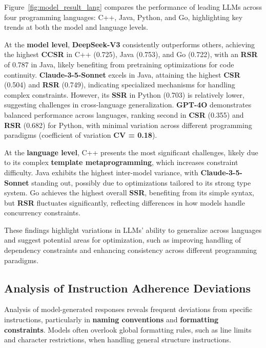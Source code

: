 Figure~\ref{fig:model_result_lang} compares the performance of leading LLMs across four programming languages: C++, Java, Python, and Go, highlighting key trends at both the model and language levels.

At the \textbf{model level}, \textbf{DeepSeek-V3} consistently outperforms others, achieving the highest \textbf{CCSR} in C++ (0.725), Java (0.753), and Go (0.722), with an \textbf{RSR} of 0.787 in Java, likely benefiting from pretraining optimizations for code continuity. \textbf{Claude-3-5-Sonnet} excels in Java, attaining the highest \textbf{CSR} (0.504) and \textbf{RSR} (0.749), indicating specialized mechanisms for handling complex constraints. However, its \textbf{SSR} in Python (0.703) is relatively lower, suggesting challenges in cross-language generalization. \textbf{GPT-4O} demonstrates balanced performance across languages, ranking second in \textbf{CSR} (0.355) and \textbf{RSR} (0.682) for Python, with minimal variation across different programming paradigms (coefficient of variation \textbf{CV = 0.18}).

At the \textbf{language level}, C++ presents the most significant challenges, likely due to its complex \textbf{template metaprogramming}, which increases constraint difficulty. Java exhibits the highest inter-model variance, with \textbf{Claude-3-5-Sonnet} standing out, possibly due to optimizations tailored to its strong type system. Go achieves the highest overall \textbf{SSR}, benefiting from its simple syntax, but \textbf{RSR} fluctuates significantly, reflecting differences in how models handle concurrency constraints.

These findings highlight variations in LLMs' ability to generalize across languages and suggest potential areas for optimization, such as improving handling of dependency constraints and enhancing consistency across different programming paradigms.



\subsection{Analysis of Instruction Adherence Deviations}

Analysis of model-generated responses reveals frequent deviations from specific instructions, particularly in \textbf{naming conventions} and \textbf{formatting constraints}. Models often overlook global formatting rules, such as line limits and character restrictions, when handling general structure instructions.


